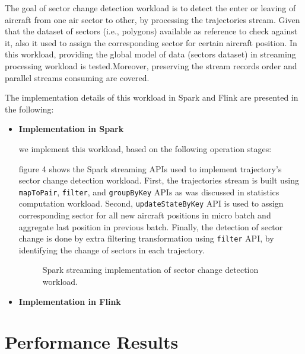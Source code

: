 \documentclass[]{article}
\begin{document}
The goal of sector change detection workload is to detect the  enter or leaving of aircraft from one air sector to other, by processing the trajectories stream. Given that the dataset of sectors (i.e., polygons) available as reference to check against it, also it used to assign the corresponding sector for certain aircraft position. In this workload, providing the  global model of data (sectors dataset) in streaming processing workload is tested.Moreover, preserving the stream records order and parallel streams consuming are covered.
 
 The implementation details of this workload in Spark and Flink are presented in the following: 
 \begin{itemize}
 \item {\bf{Implementation in Spark }}
 
 we implement this workload, based on the following operation stages: 
 
 figure 4 shows the Spark streaming APIs used to implement trajectory's sector change detection workload. First, the trajectories stream is built using \texttt{mapToPair}, \texttt{filter}, and \texttt{groupByKey} APIs as was discussed in statistics computation workload. Second,  \texttt{updateStateByKey} API is used to assign corresponding sector for all new aircraft positions in  micro batch  and aggregate last position in previous batch. Finally, the detection of sector change is done by extra filtering transformation using \texttt{filter} API, by identifying the change of sectors in each trajectory.  
 \begin{figure}[h]
  
   \centering
   
      \caption{Spark streaming implementation of sector change detection workload.}
 \end{figure} 
 
  
 \item {\bf{Implementation in Flink }}
 \end{itemize}
\section{Performance Results}
\end{document}
